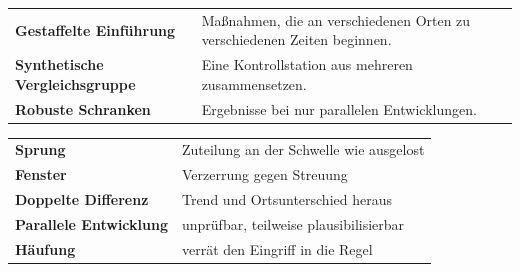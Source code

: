\begin{forschung}
\begin{center}
{\small
\renewcommand{\arraystretch}{1.45}
\begin{tabular}{@{}P{2.8cm}P{5.4cm}@{}}
\toprule
\textbf{Gestaffelte Einführung} & Maßnahmen, die an verschiedenen Orten zu verschiedenen Zeiten beginnen.\\
\textbf{Synthetische Vergleichsgruppe} & Eine Kontrollstation aus mehreren zusammensetzen.\\
\textbf{Robuste Schranken} & Ergebnisse bei nur  parallelen Entwicklungen.\\
\bottomrule
\end{tabular}}
\end{center}

\begin{center}
\begin{minipage}{0.88\textwidth}
\end{minipage}
\end{center}
\end{forschung}

\begin{merksatz}
\begin{center}
\renewcommand{\arraystretch}{1.5}
\begin{tabular}{@{}P{3.0cm}P{5.6cm}@{}}
\toprule
\textbf{Sprung} & Zuteilung an der Schwelle wie ausgelost\\
\textbf{Fenster} & Verzerrung gegen Streuung\\
\textbf{Doppelte Differenz} & Trend und Ortsunterschied heraus\\
\textbf{Parallele Entwicklung} & unprüfbar, teilweise plausibilisierbar\\
\textbf{Häufung} & verrät den Eingriff in die Regel\\
\bottomrule
\end{tabular}
\end{center}

\begin{center}
\begin{minipage}{0.88\textwidth}
\end{minipage}
\end{center}
\end{merksatz}
